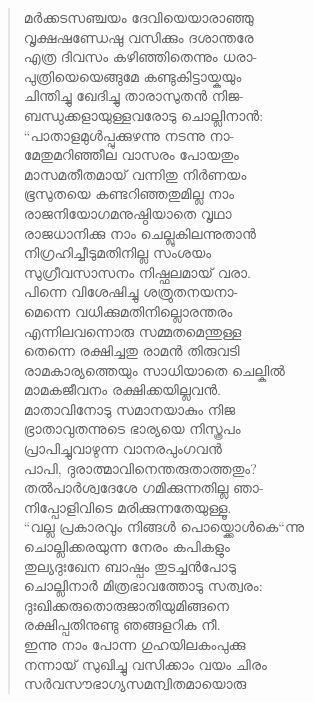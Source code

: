 \begin{verse}
മര്‍ക്കടസഞ്ചയം ദേവിയെയാരാഞ്ഞു\\
വൃക്ഷഷണ്ഡേഷു വസിക്കും ദശാന്തരേ\\
എത്ര ദിവസം കഴിഞ്ഞിതെന്നും ധരാ-\\
പുത്രിയെയെങ്ങുമേ കണ്ടുകിട്ടായ്കയും\\
ചിന്തിച്ചു ഖേദിച്ചു താരാസുതന്‍ നിജ-\\
ബന്ധുക്കളായുള്ളവരോടു ചൊല്ലിനാന്‍:\\
“പാതാളമുള്‍പ്പുക്കുഴന്നു നടന്നു നാ-\\
മേതുമറിഞ്ഞീല വാസരം പോയതും\\
മാസമതീതമായ് വന്നിതു നിര്‍ണയം\\
ഭൂസുതയെ കണ്ടറിഞ്ഞതുമില്ല നാം\\
രാജനിയോഗമനുഷ്ഠിയാതെ വൃഥാ\\
രാജധാനിക്കു നാം ചെല്ലുകിലന്നുതാന്‍\\
നിഗ്രഹിച്ചീടുമതിനില്ല സംശയം\\
സുഗ്രീവസാസനം നിഷ്ഫലമായ് വരാ.\\
പിന്നെ വിശേഷിച്ചു ശത്രുതനയനാ-\\
മെന്നെ വധിക്കുമതിനില്ലൊരന്തരം\\
എന്നിലവന്നൊരു സമ്മതമെന്തുള്ള\\
തെന്നെ രക്ഷിച്ചതു രാമന്‍ തിരുവടി\\
രാമകാര്യത്തെയും സാധിയാതെ ചെല്കില്‍\\
മാമകജീവനം രക്ഷിക്കയില്ലവന്‍.\\
മാതാവിനോടു സമാനയാകും നിജ\\
ഭ്രാതാവുതന്നുടെ ഭാര്യയെ നിസ്ത്രപം\\
പ്രാപിച്ചുവാഴുന്ന വാനരപുംഗവന്‍\\
പാപി, ദുരാത്മാവിനെന്തരുതാത്തതും?\\
തല്‍പാര്‍ശ്വദേശേ ഗമിക്കുന്നതില്ല ഞാ-\\
നിപ്പോളിവിടെ മരിക്കുന്നതേയുള്ളൂ.\\
“വല്ല പ്രകാരവും നിങ്ങള്‍ പൊയ്ക്കൊള്‍കെ“ന്നു\\
ചൊല്ലിക്കരയുന്ന നേരം കപികളും\\
തുല്യദുഃഖേന ബാഷ്പം തുടച്ചന്‍പോടു\\
ചൊല്ലിനാര്‍ മിത്രഭാവത്തോടു സത്വരം:\\
ദുഃഖിക്കരുതൊരുജാതിയുമിങ്ങനെ\\
രക്ഷിപ്പതിനുണ്ടു ഞങ്ങളറിക നീ.\\
ഇന്നു നാം പോന്ന ഗുഹയിലകംപുക്കു\\
നന്നായ് സുഖിച്ചു വസിക്കാം വയം ചിരം\\
സര്‍വസൗഭാഗ്യസമന്വിതമായൊരു\\

\end{verse}
